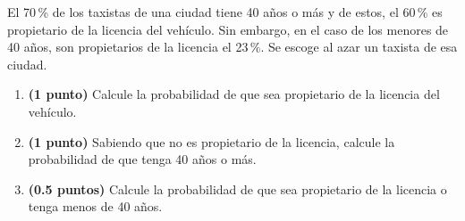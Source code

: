 
El 70\,\% de los taxistas de una ciudad tiene 40 años o más y de estos, el 60\,\% es propietario de la licencia del vehículo. Sin embargo, en el caso de los menores de 40 años, son propietarios de la licencia el 23\,\%. Se escoge al azar un taxista de esa ciudad.
\begin{enumerate}[label=\alph*),leftmargin=2.4em]
  \item \textbf{(1 punto)} Calcule la probabilidad de que sea propietario de la licencia del vehículo.
  \item \textbf{(1 punto)} Sabiendo que no es propietario de la licencia, calcule la probabilidad de que tenga 40 años o más.
  \item \textbf{(0.5 puntos)} Calcule la probabilidad de que sea propietario de la licencia o tenga menos de 40 años.
\end{enumerate}
